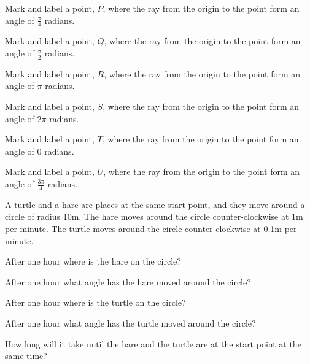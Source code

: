 \begin{problem}
  \begin{subproblem}
  \item Mark and label a point, $P$, where the ray from the origin to
    the point form an angle of $\frac{\pi}{4}$ radians.
  \item Mark and label a point, $Q$, where the ray from the origin to
    the point form an angle of $\frac{\pi}{2}$ radians.
  \item Mark and label a point, $R$, where the ray from the origin to
    the point form an angle of $\pi$ radians.
  \item Mark and label a point, $S$, where the ray from the origin to
    the point form an angle of $2\pi$ radians.
  \item Mark and label a point, $T$, where the ray from the origin to
    the point form an angle of $0$ radians.
  \item Mark and label a point, $U$, where the ray from the origin to
    the point form an angle of $\frac{3\pi}{4}$ radians.
  \end{subproblem}

  \clearpage

\item A turtle and a hare are places at the same start point, and they
  move around a circle of radius 10m. The hare moves around the circle
  counter-clockwise at 1m per minute. The turtle moves around the
  circle counter-clockwise at 0.1m per minute.
  \begin{subproblem}
  \item After one hour where is the hare on the circle?
    \vfill

  \item After one hour what angle has the hare moved around the circle?
    \vfill

  \item After one hour where is the turtle on the circle?
    \vfill

  \item After one hour what angle has the turtle moved around the circle?
    \vfill

  \item How long will it take until the hare and the turtle are at the
    start point at the same time?
    \vfill
  \end{subproblem}

\clearpage

  \clearpage

\item 
  \begin{subproblem}
  \item 
    \vfill
  \item 
    \vfill

    \clearpage

  \item 
    \vfill

  \item 
    \vfill


  \item 
    \vfill
  \end{subproblem}



\end{problem}

